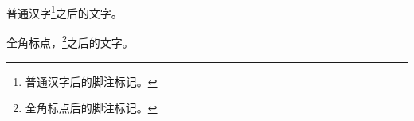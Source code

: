 \documentclass[fontset=fandol]{ctexart}
\begin{document}
\noindent 普通汉字\footnote{普通汉字后的脚注标记。}之后的文字。\par
\noindent 全角标点，\footnote{全角标点后的脚注标记。}之后的文字。\par
\end{document}
